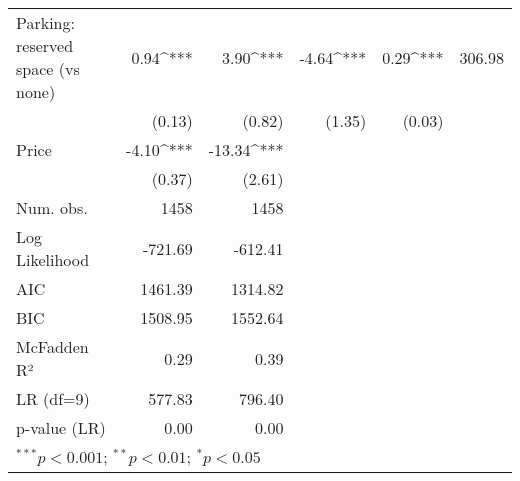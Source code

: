 \begin{table}[h]
\begin{center}
\begin{tabular}{l D{.}{.}{4.5} D{.}{.}{4.5} D{.}{.}{2.5} D{.}{.}{2.5} D{.}{.}{3.2}}
Parking: reserved space (vs none)  & 0.94^{***}  & 3.90^{***}   & -4.64^{***} & 0.29^{***} & 306.98 \\
                                   & (0.13)      & (0.82)       & (1.35)      & (0.03)     &        \\
Price                              & -4.10^{***} & -13.34^{***} &             &            &        \\
                                   & (0.37)      & (2.61)       &             &            &        \\
\midrule
Num. obs.                          & 1458        & 1458         &             &            &        \\
Log Likelihood                     & -721.69     & -612.41      &             &            &        \\
AIC                                & 1461.39     & 1314.82      &             &            &        \\
BIC                                & 1508.95     & 1552.64      &             &            &        \\
McFadden R²                        & 0.29        & 0.39         &             &            &        \\
LR  (df=9)                       & 577.83      & 796.40       &             &            &        \\
p-value (LR)                       & 0.00        & 0.00         &             &            &        \\
\bottomrule
{}
\end{tabular}
\end{center}
\end{table}
